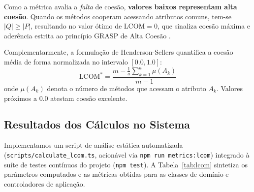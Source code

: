 \documentclass[12pt]{article}
\begin{document}
Como a métrica avalia a \textit{falta} de coesão, \textbf{valores baixos representam alta coesão}. Quando os métodos cooperam acessando atributos comuns, tem-se $|Q| \ge |P|$, resultando no valor ótimo de $\text{LCOM} = 0$, que sinaliza coesão máxima e aderência estrita ao princípio GRASP de Alta Coesão \cite{larman2004}.

Complementarmente, a formulação de Henderson-Sellers \cite{henderson1996} quantifica a coesão média de forma normalizada no intervalo $[0.0, 1.0]$:
\begin{equation}
\text{LCOM}^* = \frac{m - \frac{1}{a} \sum_{k=1}^{a} \mu(A_k)}{m - 1}
\end{equation}
onde $\mu(A_k)$ denota o número de métodos que acessam o atributo $A_k$. Valores próximos a $0.0$ atestam coesão excelente.

\subsection{Resultados dos Cálculos no Sistema}

Implementamos um script de análise estática automatizada (\texttt{scripts/calculate\_lcom.ts}, acionável via \texttt{npm run metrics:lcom}) integrado à suíte de testes contínuos do projeto (\texttt{npm test}). A Tabela~\ref{tab:lcom} sintetiza os parâmetros computados e as métricas obtidas para as classes de domínio e controladores de aplicação.
\end{document}

